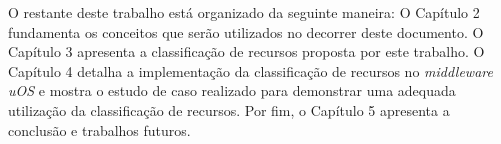 O restante deste trabalho está organizado da seguinte maneira: O Capítulo 2 fundamenta os conceitos que serão utilizados no decorrer deste documento. O Capítulo 3 apresenta a classificação de recursos proposta por este trabalho. O Capítulo 4 detalha a implementação da classificação de recursos no \emph{middleware} \emph{uOS} e mostra o estudo de caso realizado para demonstrar uma adequada utilização da classificação de recursos. Por fim, o Capítulo 5 apresenta a conclusão e trabalhos futuros.

